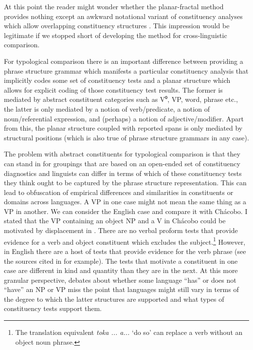 \documentclass[output=paper,hidelinks]{langscibook}
\begin{document}
At this point the reader might wonder whether the planar-fractal method provides nothing except an awkward notational variant of constituency analyses which allow overlapping constituency structures \citep{Sadock1980, sadock1991autolexical}. This impression would be legitimate if we stopped short of developing the method for cross-linguistic comparison.

For typological comparison there is an important difference between providing a phrase structure grammar which manifests a particular constituency analysis that implicitly codes some set of constituency tests and a planar structure which allows for explicit coding of those constituency test results. The former is mediated by abstract constituent categories such as V⁰, VP, word, phrase etc., the latter is only mediated by a notion of verb/predicate, a notion of noun/referential expression, and (perhaps) a notion of adjective/modifier. Apart from this, the planar structure coupled with reported spans is only mediated by structural positions (which is also true of phrase structure grammars in any case).

The problem with abstract constituents for typological comparison is that they can stand in for groupings that are based on an open-ended set of constituency diagnostics and linguists can differ in terms of which of these constituency tests they think ought to be captured by the phrase structure representation. This can lead to obfuscation of empirical differences and similarities in constituents or domains across languages. A VP in one case might not mean the same thing as a VP in another. We can consider the English case and compare it with Chácobo. I stated that the VP containing an object NP and a V in Chácobo could be motivated by displacement in . There are no verbal proform tests that provide evidence for a verb and object constituent which excludes the subject.\footnote{The translation equivalent \textit{toka ... a...} `do so' can replace a verb without an object noun phrase.} However, in English there are a host of tests that provide evidence for the verb phrase (see the sources cited in \citealt{osborne2018tests} for example). The tests that motivate a constituent in one case are different in kind and quantity than they are in the next. At this more granular perspective, debates about whether some language ``has'' or does not ``have'' an NP or VP \citep{austin1996non, louagie2021nouna} miss the point that languages might still vary in terms of the degree to which the latter structures are supported and what types of constituency tests support them.
\end{document}
